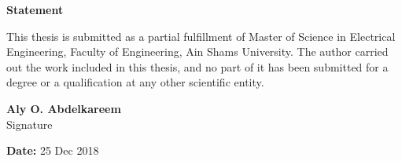 \setlength{\thesignaturewidth}{2cm}
\newpage
\thispagestyle{empty}
\begin{center}\huge\textbf{Statement}\end{center}
\Large
\vfill
This thesis is submitted as a partial fulfillment of Master of Science in Electrical Engineering, Faculty of Engineering, Ain Shams University.
The author carried out the work included in this thesis, and no part of it has been submitted for a degree or a qualification at any other scientific entity. 






\vfill
\begin{flushright}
\large
\textbf{Aly O. Abdelkareem} \\

\small
Signature \\
\dotfill \hspace{0.1\thesignaturewidth}

\textbf{Date:} 25 Dec 2018 \\
\end{flushright}
\vfill

\normalsize
